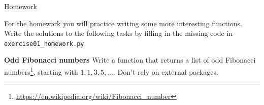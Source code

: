 \documentclass[a4paper, draft=False]{scrartcl}
\begin{document}
\newpage
\begin{exam}[Homework]{Homework}
  \begin{instructions}
    For the homework you will practice writing some more interesting functions.
    Write the solutions to the following tasks by filling in the missing code in
    \texttt{exercise01\_homework.py}.
  \end{instructions}

  \begin{problem}[3]\textbf{Odd Fibonacci numbers}
    Write a function  that returns a
    list of  odd Fibonacci
    numbers\footnote{\url{https://en.wikipedia.org/wiki/Fibonacci_number}},
    starting with $1, 1, 3, 5, \ldots$. Don't rely on external packages.
  \end{problem}
\end{exam}
\end{document}
